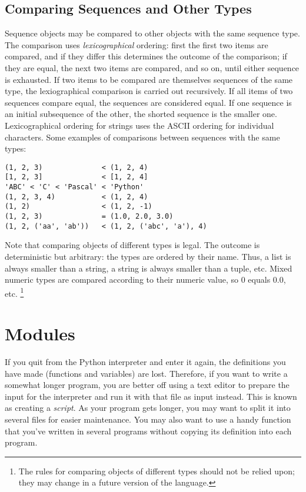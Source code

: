 \section{Comparing Sequences and Other Types}

Sequence objects may be compared to other objects with the same
sequence type.  The comparison uses {\em lexicographical} ordering:
first the first two items are compared, and if they differ this
determines the outcome of the comparison; if they are equal, the next
two items are compared, and so on, until either sequence is exhausted.
If two items to be compared are themselves sequences of the same type,
the lexiographical comparison is carried out recursively.  If all
items of two sequences compare equal, the sequences are considered
equal.  If one sequence is an initial subsequence of the other, the
shorted sequence is the smaller one.  Lexicographical ordering for
strings uses the ASCII ordering for individual characters.  Some
examples of comparisons between sequences with the same types:

\bcode\begin{verbatim}
(1, 2, 3)              < (1, 2, 4)
[1, 2, 3]              < [1, 2, 4]
'ABC' < 'C' < 'Pascal' < 'Python'
(1, 2, 3, 4)           < (1, 2, 4)
(1, 2)                 < (1, 2, -1)
(1, 2, 3)              = (1.0, 2.0, 3.0)
(1, 2, ('aa', 'ab'))   < (1, 2, ('abc', 'a'), 4)
\end{verbatim}\ecode
%
Note that comparing objects of different types is legal.  The outcome
is deterministic but arbitrary: the types are ordered by their name.
Thus, a list is always smaller than a string, a string is always
smaller than a tuple, etc.  Mixed numeric types are compared according
to their numeric value, so 0 equals 0.0, etc.%
\footnote{
	The rules for comparing objects of different types should
	not be relied upon; they may change in a future version of
	the language.
}


\chapter{Modules}

If you quit from the Python interpreter and enter it again, the
definitions you have made (functions and variables) are lost.
Therefore, if you want to write a somewhat longer program, you are
better off using a text editor to prepare the input for the interpreter
and run it with that file as input instead.  This is known as creating a
{\em script}.  As your program gets longer, you may want to split it
into several files for easier maintenance.  You may also want to use a
handy function that you've written in several programs without copying
its definition into each program.

